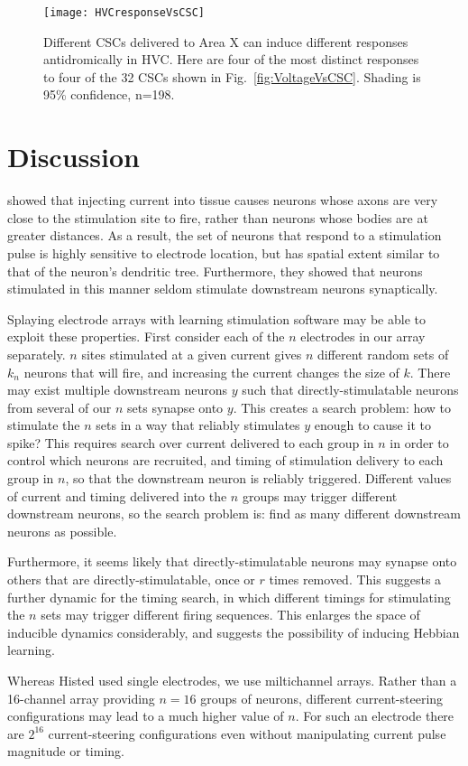 \documentclass[10pt,letterpaper]{article}
\newcommand\fig[1]{Fig.~\ref{#1}}
\begin{document}
\begin{figure}
  \texttt{[image: HVCresponseVsCSC]}
  \caption{Different CSCs delivered to Area X can induce different responses antidromically in HVC.  Here are four of the most distinct responses to four of the 32 CSCs shown in \fig{fig:VoltageVsCSC}.  Shading is 95\% confidence, n=198.}
  \label{fig:HVCresponseVsCSC}
\end{figure}


\section{Discussion}

\cite{Histed2009stimulation} showed that injecting current into tissue causes neurons whose axons are very close to the stimulation site to fire, rather than neurons whose bodies are at greater distances.  As a result, the set of neurons that respond to a stimulation pulse is highly sensitive to electrode location, but has spatial extent similar to that of the neuron's dendritic tree.  Furthermore, they showed that neurons stimulated in this manner seldom stimulate downstream neurons synaptically.

Splaying electrode arrays with learning stimulation software may be able to exploit these properties.  First consider each of the $n$ electrodes in our array separately.  $n$ sites stimulated at a given current gives $n$ different random sets of $k_n$ neurons that will fire, and increasing the current changes the size of $k$.  There may exist multiple downstream neurons $y$ such that directly-stimulatable neurons from several of our $n$ sets synapse onto $y$.  This creates a search problem: how to stimulate the $n$ sets in a way that reliably stimulates $y$ enough to cause it to spike?  This requires search over current delivered to each group in $n$ in order to control which neurons are recruited, and timing of stimulation delivery to each group in $n$, so that the downstream neuron is reliably triggered.  Different values of current and timing delivered into the $n$ groups may trigger different downstream neurons, so the search problem is: find as many different downstream neurons as possible.

Furthermore, it seems likely that directly-stimulatable neurons may synapse onto others that are directly-stimulatable, once or $r$ times removed.  This suggests a further dynamic for the timing search, in which different timings for stimulating the $n$ sets may trigger different firing sequences.  This enlarges the space of inducible dynamics considerably, and suggests the possibility of inducing Hebbian learning.

Whereas Histed used single electrodes, we use miltichannel arrays.  Rather than a 16-channel array providing $n=16$ groups of neurons, different current-steering configurations may lead to a much higher value of $n$.  For such an electrode there are $2^{16}$ current-steering configurations even without manipulating current pulse magnitude or timing.


\end{document}
